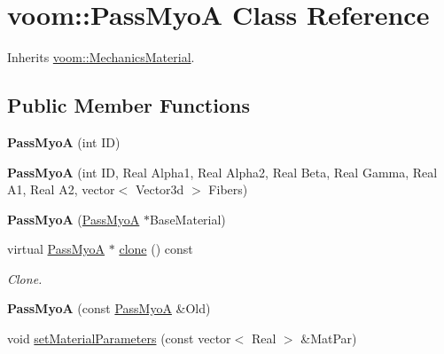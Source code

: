 \hypertarget{classvoom_1_1_pass_myo_a}{
\section{voom::PassMyoA Class Reference}
\label{classvoom_1_1_pass_myo_a}
}


Inherits \hyperlink{classvoom_1_1_mechanics_material}{voom::MechanicsMaterial}.\subsection*{Public Member Functions}
\begin{DoxyCompactItemize}
\item 
\hypertarget{classvoom_1_1_pass_myo_a_a8fd8bc56c5905aa4900e0b86f834d82e}{
{\bfseries PassMyoA} (int ID)}
\label{classvoom_1_1_pass_myo_a_a8fd8bc56c5905aa4900e0b86f834d82e}

\item 
\hypertarget{classvoom_1_1_pass_myo_a_a1cffed4cd5185b60271ed0fd9d8a2c64}{
{\bfseries PassMyoA} (int ID, Real Alpha1, Real Alpha2, Real Beta, Real Gamma, Real A1, Real A2, vector$<$ Vector3d $>$ Fibers)}
\label{classvoom_1_1_pass_myo_a_a1cffed4cd5185b60271ed0fd9d8a2c64}

\item 
\hypertarget{classvoom_1_1_pass_myo_a_a8577f3aeea3cd0bd897e38b9f8ee34e4}{
{\bfseries PassMyoA} (\hyperlink{classvoom_1_1_pass_myo_a}{PassMyoA} $\ast$BaseMaterial)}
\label{classvoom_1_1_pass_myo_a_a8577f3aeea3cd0bd897e38b9f8ee34e4}

\item 
\hypertarget{classvoom_1_1_pass_myo_a_afb1197905decf2727cd8b4270e9bbc92}{
virtual \hyperlink{classvoom_1_1_pass_myo_a}{PassMyoA} $\ast$ \hyperlink{classvoom_1_1_pass_myo_a_afb1197905decf2727cd8b4270e9bbc92}{clone} () const }
\label{classvoom_1_1_pass_myo_a_afb1197905decf2727cd8b4270e9bbc92}

\begin{DoxyCompactList}\small\item\em Clone. \item\end{DoxyCompactList}\item 
\hypertarget{classvoom_1_1_pass_myo_a_a3596d5cad17933f7370a32708cdd4e20}{
{\bfseries PassMyoA} (const \hyperlink{classvoom_1_1_pass_myo_a}{PassMyoA} \&Old)}
\label{classvoom_1_1_pass_myo_a_a3596d5cad17933f7370a32708cdd4e20}

\item 
\hypertarget{classvoom_1_1_pass_myo_a_aed01249dfdcb6fb10df34160872addf6}{
void \hyperlink{classvoom_1_1_pass_myo_a_aed01249dfdcb6fb10df34160872addf6}{setMaterialParameters} (const vector$<$ Real $>$ \&MatPar)}
\label{classvoom_1_1_pass_myo_a_aed01249dfdcb6fb10df34160872addf6}


\end{DoxyCompactItemize}
